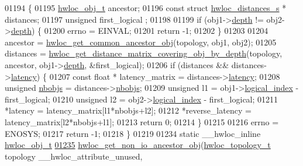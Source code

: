 \begin{DoxyCode}
01194 \{
01195   \hyperlink{a00016}{hwloc_obj_t} ancestor;
01196   \textcolor{keyword}{const} \textcolor{keyword}{struct }\hyperlink{a00014}{hwloc_distances_s} * distances;
01197   \textcolor{keywordtype}{unsigned} first\_logical ;
01198 
01199   \textcolor{keywordflow}{if} (obj1->\hyperlink{a00016_a9d82690370275d42d652eccdea5d3ee5}{depth} != obj2->\hyperlink{a00016_a9d82690370275d42d652eccdea5d3ee5}{depth}) \{
01200     errno = EINVAL;
01201     \textcolor{keywordflow}{return} -1;
01202   \}
01203 
01204   ancestor = \hyperlink{a00053_ga52a334f17c6b5b409d5cc6bb4ab8a2ab}{hwloc_get_common_ancestor_obj}(topology, obj1, obj2);
01205   distances = \hyperlink{a00063_ga186ac2711b98a12cf46d58cd005fbb51}{hwloc_get_distance_matrix_covering_obj_by_depth}(topology, ancestor,
       obj1->\hyperlink{a00016_a9d82690370275d42d652eccdea5d3ee5}{depth}, &first\_logical);
01206   \textcolor{keywordflow}{if} (distances && distances->\hyperlink{a00014_a0f70f48d1bfb18e5e2008825da2967c9}{latency}) \{
01207     \textcolor{keyword}{const} \textcolor{keywordtype}{float} * latency\_matrix = distances->\hyperlink{a00014_a0f70f48d1bfb18e5e2008825da2967c9}{latency};
01208     \textcolor{keywordtype}{unsigned} \hyperlink{a00014_a4ca2af858cebbce7324ec49903d09474}{nbobjs} = distances->\hyperlink{a00014_a4ca2af858cebbce7324ec49903d09474}{nbobjs};
01209     \textcolor{keywordtype}{unsigned} l1 = obj1->\hyperlink{a00016_a0d07fb7b8935e137c94d75a3eb492ae9}{logical_index} - first\_logical;
01210     \textcolor{keywordtype}{unsigned} l2 = obj2->\hyperlink{a00016_a0d07fb7b8935e137c94d75a3eb492ae9}{logical_index} - first\_logical;
01211     *latency = latency\_matrix[l1*nbobjs+l2];
01212     *reverse\_latency = latency\_matrix[l2*nbobjs+l1];
01213     \textcolor{keywordflow}{return} 0;
01214   \}
01215 
01216   errno = ENOSYS;
01217   \textcolor{keywordflow}{return} -1;
01218 \}
01219 
01234 \textcolor{keyword}{static} \_\_hwloc\_inline \hyperlink{a00016}{hwloc_obj_t}
\hypertarget{a00031_source_l01235}{}\hyperlink{a00064_ga3603275746a8792e54415d79763aa9e9}{01235} \hyperlink{a00064_ga3603275746a8792e54415d79763aa9e9}{hwloc_get_non_io_ancestor_obj}(\hyperlink{a00039_ga9d1e76ee15a7dee158b786c30b6a6e38}{hwloc_topology_t} topology \_\_hwloc\_attribute\_unused,
      

\end{DoxyCode}
